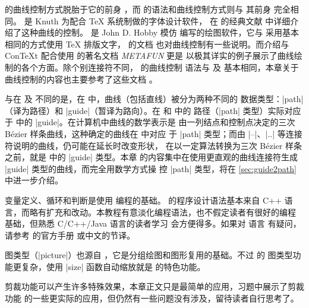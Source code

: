 \Asy{} 的曲线控制方式脱胎于它的前身 \MP{}，而 \MP{} 的语法和曲线控制方式则与
其前身 \MF{} 完全相同。\MF{} 是 Knuth 为配合 \TeX{} 系统制做的字体设计软件，
在 \MF{} 的经典文献 \cite{knuth1986} 中详细介绍了这种曲线的控制。\MP{} 是
John D. Hobby 模仿 \MF{} 编写的绘图软件，它与 \Asy{} 采用基本相同的方式使用
\TeX{} 排版文字，\MP{} 的文档 \cite{mpman} 也对曲线控制有一些说明。而介绍与
\mbox{Con\TeX{}t} 配合使用 \MP{} 的著名文档 \emph{METAFUN}\cite{metafun} 更是
以极其详实的例子展示了曲线绘制的各个方面。除个别连接符不同，\Asy{} 的曲线控制
语法与 \MF{} 及 \MP{} 基本相同，本章关于曲线控制的内容也主要参考了这些文档
\cite{knuth1986, mpman, metafun}。

与在 \MF{} 及 \MP{} 不同的是，在 \Asy{} 中，曲线（包括直线）被分为两种不同的
数据类型：|path|（译为路径）和 |guide|（暂译为路向）。在 \MF{} 和 \MP{} 中的
路径（|path| 类型）实际对应于 \Asy{} 中的 |guide|。在计算机中曲线的数学表示是
由一列结点和控制点决定的三次 Bézier 样条曲线，这种确定的曲线在 \Asy{} 中对应
于 |path| 类型；而由 |--|、|..| 等连接符说明的曲线，仍可能在延长时改变形状，
在以一定算法转换为三次 Bézier 样条之前，就是 \Asy{} 中的 |guide| 类型。本章
的内容集中在使用更直观的曲线连接符生成 |guide| 类型的曲线，而完全用数学方式操
控 |path| 类型，将在 \autoref{sec:guide2path} 中进一步介绍。

变量定义、循环和判断是使用 \Asy{} 编程的基础。\Asy{} 的程序设计语法基本来自
C++ 语言，而略有扩充和改动。本教程有意淡化编程语法，也不假定读者有很好的编程
基础，但熟悉 C/C++/Java 语言的读者学习 \Asy{} 会方便得多。如果对 \Asy{} 语言
有疑问，请参考 \Asy{} 的官方手册 \cite{asyman} 或中文的节译。

图类型（|picture|）也源自 \MP{}，它是分组绘图和图形复用的基础。不过 \Asy{} 的
图类型功能更复杂，使用 |size| 函数自动缩放就是 \Asy{} 的特色功能。

剪裁功能可以产生许多特殊效果，本章正文只是最简单的应用，习题中展示了剪裁功能
的一些更实际的应用，但仍然有一些问题没有涉及，留待读者自行思考了。

\endinput


